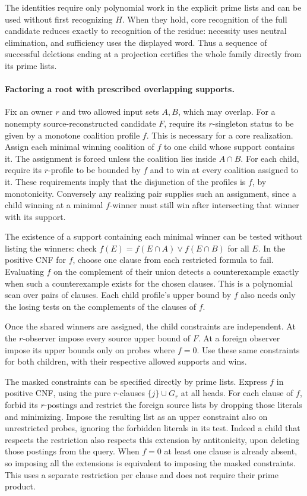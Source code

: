 The identities require only polynomial work in the
explicit prime lists and can be used without first
recognizing $H$. When they hold, core recognition of
the full candidate reduces exactly to recognition of
the residue: necessity uses neutral elimination,
and sufficiency uses the displayed word. Thus a
sequence of successful deletions ending at a
projection certifies the whole family directly from
its prime lists.

\paragraph{Factoring a root with prescribed overlapping supports.}
Fix an owner $r$ and two allowed input sets $A,B$,
which may overlap. For a nonempty source-reconstructed
candidate $F$, require its $r$-singleton status to be
given by a monotone coalition profile $f$. This is
necessary for a core realization. Assign each
minimal winning coalition of $f$ to one child whose
support contains it. The assignment is forced unless
the coalition lies inside $A\cap B$. For each child,
require its $r$-profile to be bounded by $f$ and to
win at every coalition assigned to it. These
requirements imply that the disjunction of the
profiles is $f$, by monotonicity. Conversely any
realizing pair supplies such an assignment, since
a child winning at a minimal $f$-winner must still
win after intersecting that winner with its support.

The existence of a support containing each minimal
winner can be tested without listing the winners:
check $f(E)=f(E\cap A)\lor f(E\cap B)$ for all $E$.
In the positive CNF for $f$, choose one clause
from each restricted formula to fail. Evaluating
$f$ on the complement of their union detects a
counterexample exactly when such a counterexample
exists for the chosen clauses. This is a polynomial
scan over pairs of clauses. Each child profile's
upper bound by $f$ also needs only the losing
tests on the complements of the clauses of $f$.

Once the shared winners are assigned, the child
constraints are independent. At the $r$-observer impose every
source upper bound of $F$. At a foreign observer
impose its upper bounds only on probes where $f=0$.
Use these same constraints for both children,
with their respective allowed supports and wins.

The masked constraints can be specified directly
by prime lists. Express $f$ in positive CNF,
using the pure $r$-clauses $\{j\}\cup G_r$ at all
heads. For each clause of $f$, forbid its
$r$-postings and restrict the foreign source
lists by dropping those literals and minimizing.
Impose the resulting list as an upper constraint
also on unrestricted probes, ignoring the
forbidden literals in its test. Indeed a child
that respects the restriction also respects this
extension by antitonicity, upon deleting those
postings from the query. When $f=0$ at least one
clause is already absent, so imposing all the
extensions is equivalent to imposing the masked
constraints. This uses a separate restriction per
clause and does not require their prime product.

